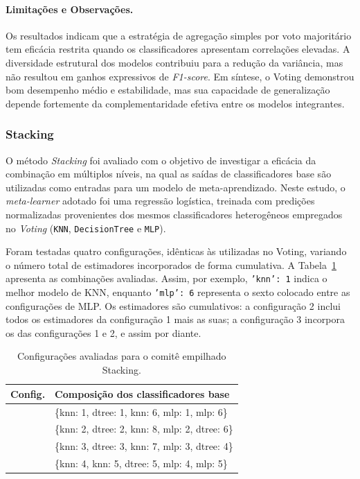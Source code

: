 \documentclass[12pt]{article}
\begin{document}
\paragraph{Limitações e Observações.}
Os resultados indicam que a estratégia de agregação simples por voto majoritário tem eficácia restrita quando os classificadores apresentam correlações elevadas.  
A diversidade estrutural dos modelos contribuiu para a redução da variância, mas não resultou em ganhos expressivos de \textit{F1-score}.  
Em síntese, o Voting demonstrou bom desempenho médio e estabilidade, mas sua capacidade de generalização depende fortemente da complementaridade efetiva entre os modelos integrantes.

\subsubsection{Stacking}

O método \textit{Stacking} foi avaliado com o objetivo de investigar a eficácia da combinação em múltiplos níveis, na qual as saídas de classificadores base são utilizadas como entradas para um modelo de meta-aprendizado.  
Neste estudo, o \textit{meta-learner} adotado foi uma regressão logística, treinada com predições normalizadas provenientes dos mesmos classificadores heterogêneos empregados no \textit{Voting} (\texttt{KNN}, \texttt{DecisionTree} e \texttt{MLP}).

Foram testadas quatro configurações, idênticas às utilizadas no Voting, variando o número total de estimadores incorporados de forma cumulativa.  
A Tabela~\ref{tab:stacking-config} apresenta as combinações avaliadas.  
Assim, por exemplo, \texttt{'knn': 1} indica o melhor modelo de KNN, enquanto \texttt{'mlp': 6} representa o sexto colocado entre as configurações de MLP.  
Os estimadores são cumulativos: a configuração 2 inclui todos os estimadores da configuração 1 mais as suas; a configuração 3 incorpora os das configurações 1 e 2, e assim por diante.

\begin{table}[H]
\centering
\caption{Configurações avaliadas para o comitê empilhado Stacking.}
\label{tab:stacking-config}
\begin{tabularx}{\textwidth}{@{}>{\centering\arraybackslash}p{0.9cm} >{\ttfamily\raggedright\arraybackslash}X@{}}
\toprule
\textbf{Config.} & \textbf{Composição dos classificadores base} \\
\midrule
1 & \{knn: 1, dtree: 1, knn: 6, mlp: 1, mlp: 6\} \\
2 & \{knn: 2, dtree: 2, knn: 8, mlp: 2, dtree: 6\} \\
3 & \{knn: 3, dtree: 3, knn: 7, mlp: 3, dtree: 4\} \\
4 & \{knn: 4, knn: 5, dtree: 5, mlp: 4, mlp: 5\} \\
\bottomrule
\end{tabularx}
\end{table}
\end{document}
